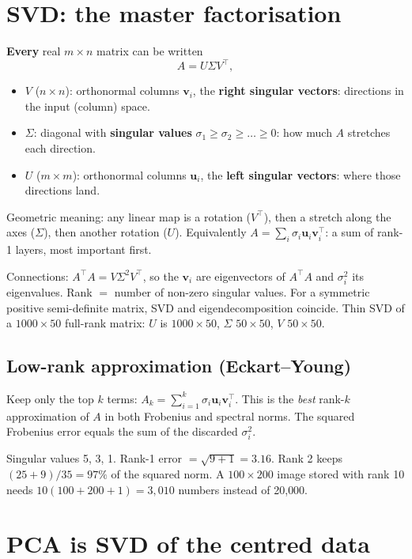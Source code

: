 \section{SVD: the master factorisation}
\textbf{Every} real $m\times n$ matrix can be written
\[ A = U\Sigma V^\top, \]
\begin{itemize}
\item $V$ ($n\times n$): orthonormal columns $\mathbf v_i$, the \textbf{right singular vectors}: directions in the input (column) space.
\item $\Sigma$: diagonal with \textbf{singular values} $\sigma_1\ge\sigma_2\ge\dots\ge0$: how much $A$ stretches each direction.
\item $U$ ($m\times m$): orthonormal columns $\mathbf u_i$, the \textbf{left singular vectors}: where those directions land.
\end{itemize}
Geometric meaning: any linear map is a rotation ($V^\top$), then a stretch along the axes ($\Sigma$), then another rotation ($U$).
Equivalently $A = \sum_i\sigma_i\mathbf u_i\mathbf v_i^\top$: a sum of rank-1 layers, most important first.

Connections: $A^\top A = V\Sigma^2V^\top$, so the $\mathbf v_i$ are eigenvectors of $A^\top A$ and $\sigma_i^2$ its eigenvalues. Rank $=$
number of non-zero singular values. For a symmetric positive semi-definite matrix, SVD and eigendecomposition coincide. Thin SVD of a
$1000\times50$ full-rank matrix: $U$ is $1000\times50$, $\Sigma$ $50\times50$, $V$ $50\times50$.

\subsection{Low-rank approximation (Eckart--Young)}
Keep only the top $k$ terms: $A_k = \sum_{i=1}^k\sigma_i\mathbf u_i\mathbf v_i^\top$. This is the \emph{best} rank-$k$ approximation of $A$ in
both Frobenius and spectral norms. The squared Frobenius error equals the sum of the discarded $\sigma_i^2$.
\begin{example}[: compression]
Singular values 5, 3, 1. Rank-1 error $=\sqrt{9 + 1} = 3.16$. Rank 2 keeps $(25 + 9)/35 = 97\%$ of the squared norm. A $100\times200$ image
stored with rank 10 needs $10(100 + 200 + 1) = 3{,}010$ numbers instead of 20{,}000.
\end{example}

\section{PCA is SVD of the centred data}
